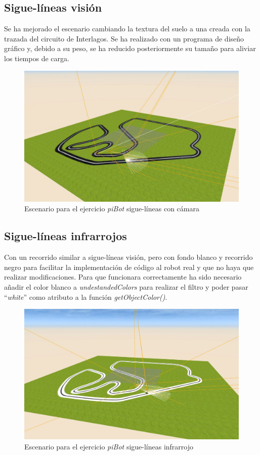 \subsection{Sigue-líneas visión}
    Se ha mejorado el escenario cambiando la textura del suelo a una creada con la trazada del circuito de Interlagos. Se ha realizado con un programa de diseño gráfico y, debido a su peso, se ha reducido posteriormente su tamaño para aliviar los tiempos de carga. 
    
    \begin{figure}[H]
    \centering
    \includegraphics[scale=0.4]{img/pibot_vision.JPG}
    \caption{Escenario para el ejercicio \textit{piBot} sigue-líneas con cámara} \label{fig:siguelineavision}
    \end{figure}
    
\subsection{Sigue-líneas infrarrojos}
    Con un recorrido similar a sigue-líneas visión, pero con fondo blanco y recorrido negro para facilitar la implementación de código al robot real y que no haya que realizar modificaciones. Para que funcionara correctamente ha sido necesario añadir el color blanco a \textit{undestandedColors} para realizar el filtro y poder pasar ``\textit{white}'' como atributo a la función \textit{getObjectColor()}.
    
    \begin{figure}[H]
    \centering
    \includegraphics[scale=0.4]{img/siguelineas_ir.JPG}
    \caption{Escenario para el ejercicio \textit{piBot} sigue-líneas infrarrojo} \label{fig:siguelineasIR}
    \end{figure}
    
